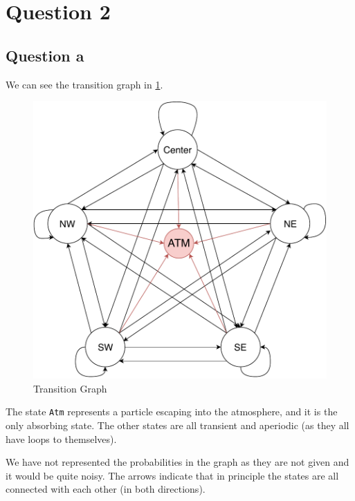 \documentclass[11pt, a4paper]{article}
\begin{document}
\section{Question 2}
\subsection{Question a}
We can see the transition graph in \cref{fig:trans-graph}.
\begin{figure}[H]
	\centering
	\includegraphics[scale = .7]{figures/transition-graph.pdf}
	\caption{Transition Graph}
	\label{fig:trans-graph}
\end{figure}
The state \verb|Atm| represents a particle escaping into the atmosphere, and it is the only absorbing state. The other states are all transient and aperiodic (as they all have loops to themselves).

We have not represented the probabilities in the graph as they are not given and it would be quite noisy. The arrows indicate that in principle the states are all connected with each other (in both directions).
\end{document}
